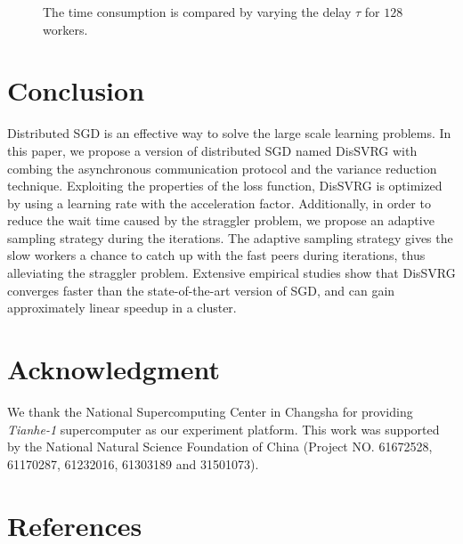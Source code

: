 \documentclass[preprint,review,11pt,a4paper]{elsarticle}
\begin{document}
\begin{figure}
\centering
{}
\caption{The time consumption is compared by varying the delay $\tau$ for $128$ workers.}
\label{figure_evaluation3_delay}
\end{figure}

\section{Conclusion}
\label{conclusion}
Distributed SGD is an effective way to solve the large scale learning problems. In this paper, we propose a version of distributed SGD named DisSVRG with combing the asynchronous communication protocol and the variance reduction technique. Exploiting the properties of the loss function, DisSVRG is optimized by using a learning rate with the acceleration factor. Additionally, in order to reduce the wait time caused by the straggler problem, we propose an adaptive sampling strategy during the iterations. The adaptive sampling strategy gives the slow workers a chance to catch up with the fast peers during iterations, thus alleviating the straggler problem. Extensive empirical studies show that DisSVRG converges faster than the state-of-the-art version of SGD, and can gain approximately linear speedup in a cluster.

\section*{Acknowledgment}
We thank the National Supercomputing Center in Changsha for providing \emph{Tianhe-1} supercomputer as our experiment platform. This work was supported by the National Natural Science Foundation of China (Project NO. 61672528, 61170287, 61232016, 61303189 and 31501073).

\section*{References}


\end{document}
